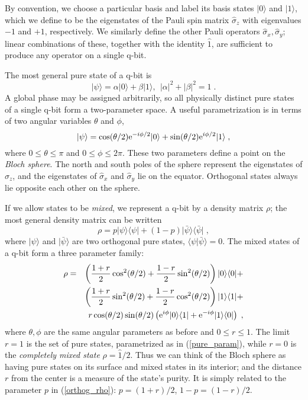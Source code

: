 \documentclass[12pt]{article}
\def\bra#1{{\langle #1 |}}
\def\ket#1{{| #1 \rangle}}
\def\bracket#1#2{{\langle #1 | #2 \rangle}}
\def\sx{{\hat\sigma_x}}
\def\sy{{\hat\sigma_y}}
\def\sz{{\hat\sigma_z}}
\def\id{{\hat 1}}
\def\e{{\rm e}}
\begin{document}
By convention, we choose a particular basis and label its basis states
$\ket0$ and $\ket1$, which we define to be the eigenstates of the Pauli
spin matrix $\sz$ with eigenvalues $-1$ and $+1$, respectively.
We similarly define the other Pauli operators $\sx,\sy$; linear combinations
of these, together with the identity $\id$, are sufficient to produce any
operator on a single q-bit.

The most general pure state of a q-bit is
\begin{equation}
\ket\psi = \alpha\ket0 + \beta\ket1,\ \ |\alpha|^2 + |\beta|^2 = 1 \;.
\label{qbit_pure}
\end{equation}
A global phase may be assigned arbitrarily, so all physically distinct
pure states of a single q-bit form a two-parameter space.
A useful parametrization is in terms of two angular variables
$\theta$ and $\phi$,
\begin{equation}
\ket\psi = \cos(\theta/2)\e^{-i\phi/2} \ket0
  + \sin(\theta/2)\e^{i\phi/2} \ket1 \;,
\label{pure_param}
\end{equation}
where $0 \le \theta \le \pi$ and $0 \le \phi \le 2\pi$.  These two
parameters define a point on the {\it Bloch sphere}.  The north
and south poles of the sphere represent the eigenstates of $\sz$, and
the eigenstates of $\sx$ and $\sy$ lie on the equator.  Orthogonal states
always lie opposite each other on the sphere.

If we allow states to be {\it mixed}, we represent a q-bit by a density
matrix $\rho$; the most general density matrix can be written
\begin{equation}
\rho = p \ket\psi\bra\psi + (1-p) \ket{\bar\psi}\bra{\bar\psi} \;,
\label{orthog_rho}
\end{equation}
where $\ket\psi$ and $\ket{\bar\psi}$ are two orthogonal pure states,
$\bracket\psi{\bar\psi}=0$.  The mixed states of a q-bit
form a three parameter family:
\begin{eqnarray}
\rho &=& \left( {1+r\over2}\cos^2(\theta/2)
  + {1-r\over2}\sin^2(\theta/2) \right) \ket0\bra0 + \nonumber\\
&& \left( {1+r\over2}\sin^2(\theta/2)
  + {1-r\over2}\cos^2(\theta/2) \right) \ket1\bra1 + \nonumber\\
&& r \cos(\theta/2) \sin(\theta/2)
  \left( \e^{i\phi} \ket0\bra1 + \e^{-i\phi} \ket1\bra0 \right) \;,
\label{qbit_mixed}
\end{eqnarray}
where $\theta,\phi$ are the same angular parameters as before and
$0\le r \le 1$.  The limit $r=1$ is the set of pure states, parametrized as
in (\ref{pure_param}), while $r=0$ is the {\it completely mixed state}
$\rho=\id/2$.
Thus we can think of the Bloch sphere as having pure states on its surface
and mixed states in its interior; and the distance $r$ from the center is a
measure of the state's purity.  It is simply related to the parameter
$p$ in (\ref{orthog_rho}):  $p = (1+r)/2$, $1-p = (1-r)/2$.
\end{document}
